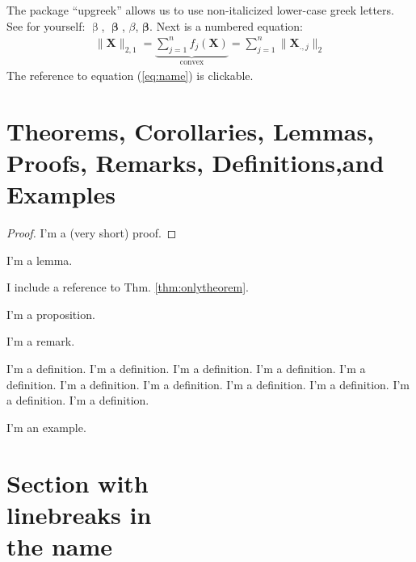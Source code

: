 The package ``upgreek'' allows us to use non-italicized lower-case greek letters. See for yourself: $\upbeta$, $\bm\upbeta$, $\beta$, $\bm\beta$. Next is a numbered equation:
\begin{align}
    \label{eq:name}
    \|\bm{X}\|_{2,1}={\underbrace{\sum_{j=1}^nf_j(\bm{X})}_{\text{convex}}}=\sum_{j=1}^n\|\bm{X}_{.,j}\|_2
\end{align}
The reference to equation (\ref{eq:name}) is clickable.
\section[Theorems, Corollaries, Lemmas, Proofs, Remarks, Definitions and Examples]{Theorems, Corollaries, Lemmas, Proofs, Remarks, Definitions,and Examples}

\begin{theorem}
    \label{thm:onlytheorem}
    \blindtext
\end{theorem}

\begin{proof}
    I'm a (very short) proof.
\end{proof}

\begin{lemma}
    I'm a lemma.
\end{lemma}

\begin{corollary}
    I include a reference to Thm. \ref{thm:onlytheorem}.
\end{corollary}

\begin{proposition}
    I'm a proposition.
\end{proposition}

\begin{remark}
    I'm a remark.
\end{remark}

\begin{definition}
    I'm a definition. I'm a definition. I'm a definition. I'm a definition. I'm a definition. I'm a definition. I'm a definition. I'm a definition. I'm a definition. I'm a definition. I'm a definition.
\end{definition}

\begin{example}
    I'm an example.
\end{example}


\section[Optional table of contents heading]{Section with\\ linebreaks in\\the
  name}


\Blindtext[2]
